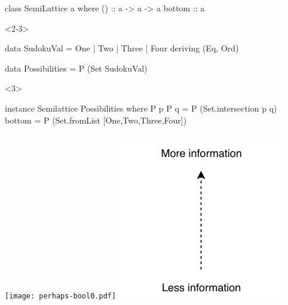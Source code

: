 \documentclass[UKenglish,usenames,dvipsnames,svgnames,table,aspectratio=169,mathserif]{beamer}
\newcommand{\nl}{\vspace{\baselineskip}}
\begin{document}
\begin{frame}[fragile]

\begin{overlayarea}{\textwidth}{0.5\textheight}
\begin{haskellcode}
class SemiLattice a where
  (\/)   :: a -> a -> a
  bottom :: a
\end{haskellcode}
\nl

\begin{onlyenv}<2-3>
\begin{haskellcode}
data SudokuVal = One | Two | Three | Four
  deriving (Eq, Ord)

data Possibilities = P (Set SudokuVal)
\end{haskellcode}
\end{onlyenv}
\nl
\begin{onlyenv}<3>
\begin{haskellcode}
instance Semilattice Possibilities where
  P p \/ P q = P (Set.intersection p q)
  bottom = P (Set.fromList [One,Two,Three,Four])
\end{haskellcode}
\end{onlyenv}
\end{overlayarea}
\end{frame}


\begin{frame}
\begin{columns}
\texttt{[image: perhaps-bool0.pdf]}
\includegraphics[scale=1.3]{set/more-info.pdf}
\end{columns}
\end{frame}
\end{document}
